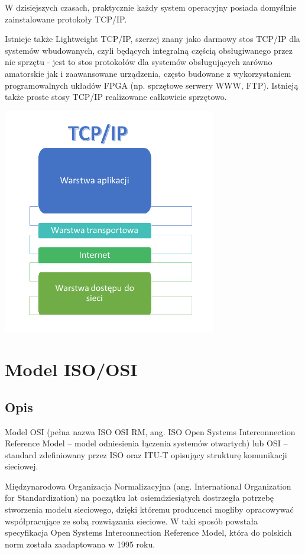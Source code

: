 \documentclass{article}
\begin{document}
W dzisiejszych czasach, praktycznie każdy system operacyjny posiada domyślnie zainstalowane protokoły TCP/IP.

Istnieje także Lightweight TCP/IP, szerzej znany jako darmowy stos TCP/IP dla systemów wbudowanych, czyli będących integralną częścią obsługiwanego przez nie sprzętu - jest to stos protokołów dla systemów obsługujących zarówno amatorskie jak i zaawansowane urządzenia, często budowane z wykorzystaniem programowalnych układów FPGA (np. sprzętowe serwery WWW, FTP). Istnieją także proste stosy TCP/IP realizowane całkowicie sprzętowo.
\begin{center}
\includegraphics[width=0.7\textwidth]{tcp.png}
\end{center}
\section{Model ISO/OSI}
\subsection{Opis}
	Model OSI (pełna nazwa ISO OSI RM, ang. ISO Open Systems Interconnection Reference Model – model odniesienia łączenia systemów otwartych) lub OSI – standard zdefiniowany przez ISO oraz ITU-T opisujący strukturę komunikacji sieciowej.

Międzynarodowa Organizacja Normalizacyjna (ang. International Organization for Standardization) na początku lat osiemdziesiątych dostrzegła potrzebę stworzenia modelu sieciowego, dzięki któremu producenci mogliby opracowywać współpracujące ze sobą rozwiązania sieciowe. W taki sposób powstała specyfikacja Open Systems Interconnection Reference Model, która do polskich norm została zaadaptowana w 1995 roku.
\end{document}
